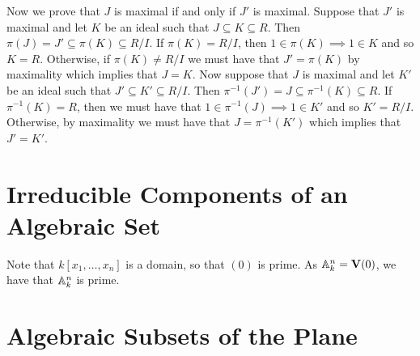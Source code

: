 \documentclass[letterpaper, 11pt, oneside]{book}
\begin{document}
\begin{sol}
\begin{enumerate}[label= (\alph*)]
          Now we prove that $J$ is maximal if and only if $J'$ is maximal.
          Suppose that $J'$ is maximal and let $K$ be an ideal such that $J \subseteq K \subseteq R$.
          Then $\pi(J) = J' \subseteq \pi(K) \subseteq R/I$.
          If $\pi(K) = R / I$, then $1 \in \pi(K) \implies 1 \in K$ and so $K = R$.
          Otherwise, if $\pi(K) \neq R / I$ we must have that $J' = \pi(K)$ by maximality which implies that $J = K$.
          Now suppose that $J$ is maximal and let $K'$ be an ideal such that $J' \subseteq K' \subseteq R/I$.
          Then $\pi^{-1}(J') = J \subseteq \pi^{-1}(K) \subseteq R$.
          If $\pi^{-1}(K) = R$, then we must have that $1 \in \pi^{-1}(J) \implies 1 \in K'$ and so $K' = R/I$.
          Otherwise, by maximality we must have that $J = \pi^{-1}(K')$ which implies that $J' = K'$.
  \end{enumerate}
\end{sol}

\clearpage

\section{Irreducible Components of an Algebraic Set}

\begin{sol}\label{ex:Curves_1.29}
  Note that $k[x_{1}, \ldots, x_{n}]$ is a domain, so that $(0)$ is prime.
  As $\mathbb{A}_{k}^{n} = \operatorname{\mathbf{V}}(0)$, we have that $\mathbb{A}_{k}^{n}$ is prime.
\end{sol}

\clearpage

\section{Algebraic Subsets of the Plane}


\printbibliography
\end{document}
